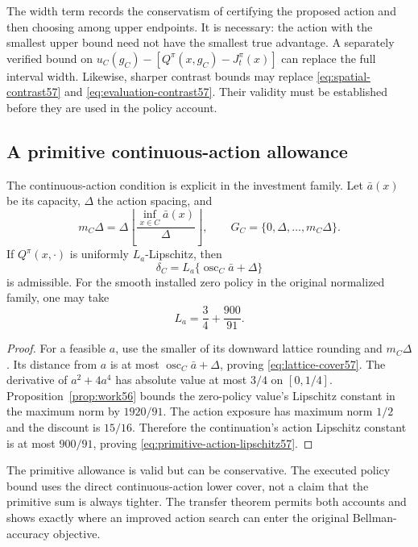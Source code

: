 The width term records the conservatism of certifying the proposed action and then choosing among upper endpoints. It is necessary: the action with the smallest upper bound need not have the smallest true advantage. A separately verified bound on $u_C(g_C)-[Q^\pi(x,g_C)-J_t^\pi(x)]$ can replace the full interval width. Likewise, sharper contrast bounds may replace \eqref{eq:spatial-contrast57} and \eqref{eq:evaluation-contrast57}. Their validity must be established before they are used in the policy account.

\subsection{A primitive continuous-action allowance}
The continuous-action condition is explicit in the investment family. Let $\bar a(x)$ be its capacity, $\Delta$ the action spacing, and
\[
 m_C\Delta=\Delta\left\lfloor\frac{\inf_{x\in C}\bar a(x)}{\Delta}\right\rfloor,
 \qquad G_C=\{0,\Delta,\ldots,m_C\Delta\}.
\]
If $Q^\pi(x,\cdot)$ is uniformly $L_a$-Lipschitz, then
\begin{equation}\label{eq:lattice-cover57}
 \delta_C=L_a\{\operatorname{osc}_C\bar a+\Delta\}
\end{equation}
is admissible. For the smooth installed zero policy in the original normalized family, one may take
\begin{equation}\label{eq:primitive-action-lipschitz57}
 L_a=\frac34+\frac{900}{91}.
\end{equation}
\begin{proof}
For a feasible $a$, use the smaller of its downward lattice rounding and $m_C\Delta$. Its distance from $a$ is at most $\operatorname{osc}_C\bar a+\Delta$, proving \eqref{eq:lattice-cover57}. The derivative of $a^2+4a^4$ has absolute value at most $3/4$ on $[0,1/4]$. Proposition~\ref{prop:work56} bounds the zero-policy value's Lipschitz constant in the maximum norm by $1920/91$. The action exposure has maximum norm $1/2$ and the discount is $15/16$. Therefore the continuation's action Lipschitz constant is at most $900/91$, proving \eqref{eq:primitive-action-lipschitz57}.
\end{proof}
The primitive allowance is valid but can be conservative. The executed policy bound uses the direct continuous-action lower cover, not a claim that the primitive sum is always tighter. The transfer theorem permits both accounts and shows exactly where an improved action search can enter the original Bellman-accuracy objective.

